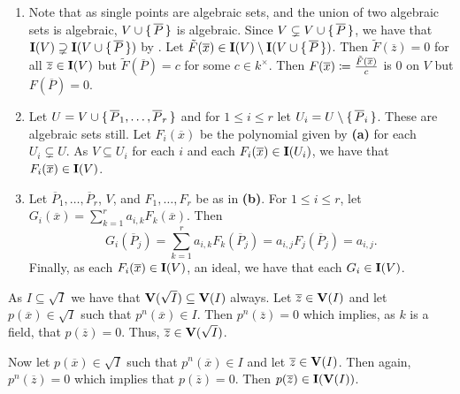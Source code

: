 \documentclass[letterpaper, 11pt, oneside]{book}
\begin{document}
\begin{sol}\label{ex:Curves_1.17}
  \begin{enumerate}[label= (\alph*)]
    \item Note that as single points are algebraic sets, and the union of two algebraic sets is algebraic, $V \cup \set{\overline{P}}$ is algebraic.
          Since $V \subsetneq V \cup \set{\overline{P}}$, we have that $\operatorname{\mathbf{I}}(V) \supsetneq \operatorname{\mathbf{I}}(V \cup \set{\overline{P}})$ by .
          Let $\tilde{F}(\overline{x}) \in \operatorname{\mathbf{I}}(V) \setminus \operatorname{\mathbf{I}}(V \cup \set{\overline{P}})$.
          Then $\tilde{F}(\overline{z}) = 0$ for all $\overline{z} \in \operatorname{\mathbf{I}}(V)$ but $\tilde{F}(\overline{P}) = c$ for some $c \in k^{\times}$.
          Then $F(\overline{x}) \coloneqq \frac{\tilde{F}(\overline{x})}{c}$ is $0$ on $V$ but $F(\overline{P}) = 0$.
    \item Let $U = V \cup \set{\overline{P}_{1}, \ldots, \overline{P}_{r}}$ and for $1 \leq i \leq r$ let $U_{i} = U \setminus \set{\overline{P}_{i}}$.
          These are algebraic sets still.
          Let $F_{i}(\overline{x})$ be the polynomial given by \textbf{(a)} for each $U_{i} \subsetneq U$.
          As $V \subseteq U_{i}$ for each $i$ and each $F_{i}(\overline{x}) \in \operatorname{\mathbf{I}}(U_{i})$, we have that $F_{i}(\overline{x}) \in \operatorname{\mathbf{I}}(V)$.
    \item Let $\overline{P}_{1}, \ldots, \overline{P}_{r}$, $V$, and $F_{1}, \ldots, F_{r}$ be as in \textbf{(b)}.
          For $1 \leq i \leq r$, let $G_{i}(\overline{x}) = \sum_{k = 1}^{r} a_{i, k} F_{k}(\overline{x})$.
          Then
          \[
            G_{i}(\overline{P}_{j}) = \sum_{k = 1}^{r} a_{i, k} F_{k}(\overline{P}_{j}) = a_{i, j}F_{j}(\overline{P}_{j}) = a_{i, j}.
          \]
          Finally, as each $F_{i}(\overline{x}) \in \operatorname{\mathbf{I}}(V)$, an ideal, we have that each $G_{i} \in \operatorname{\mathbf{I}}(V)$.
  \end{enumerate}
\end{sol}

\begin{sol}\label{ex:Curves_1.18}
\end{sol}

\begin{sol}\label{ex:Curves_1.20}
  As $I \subseteq \sqrt{I}$ we have that $\operatorname{\mathbf{V}}(\sqrt{I}) \subseteq \operatorname{\mathbf{V}}(I)$ always.
  Let $\overline{z} \in \operatorname{\mathbf{V}}(I)$ and let $p(\overline{x}) \in \sqrt{I}$ such that $p^{n}(\overline{x}) \in I$.
  Then $p^{n}(\overline{z}) = 0$ which implies, as $k$ is a field, that $p(\overline{z}) = 0$.
  Thus, $\overline{z} \in \operatorname{\mathbf{V}}(\sqrt{I})$.

  Now let $p(\overline{x}) \in \sqrt{I}$ such that $p^{n}(\overline{x}) \in I$ and let $\overline{z} \in \operatorname{\mathbf{V}}(I)$.
  Then again, $p^{n}(\overline{z}) = 0$ which implies that $p(\overline{z}) = 0$.
  Then $p(\overline{z}) \in \operatorname{\mathbf{I}}(\operatorname{\mathbf{V}}(I))$.
\end{sol}
\end{document}

